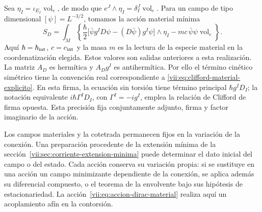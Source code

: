 Sea \(\eta_I=\iota_{E_I}\operatorname{vol}_e\), de modo que
\(e^J\wedge\eta_I=\delta_I^J\operatorname{vol}_e\). Para un
campo de tipo dimensional \([\psi]=L^{-3/2}\), tomamos la acción
material mínima
\begin{equation}
 S_D=\int_M\left\{
 \frac{\hbar}{2}
 \bigl[\bar\psi g^I D\psi-(D\bar\psi)g^I\psi\bigr]\wedge\eta_I
 -mc\,\bar\psi\psi\operatorname{vol}_e\right\}.
 \label{vii:eq:accion-dirac-material}
\end{equation}
Aquí \(\hbar=\hbar_{\rm int}\), \(c=c_{\rm int}\) y la masa
\(m\) es la lectura de la especie material en la coordenatización elegida.
Estos valores son salidas anteriores a esta realización. La matriz
\(A_D\) es hermítica y \(A_Dg^I\) es antihermítica. Por ello el
término cinético simétrico tiene la convención real correspondiente a
\eqref{vii:eq:clifford-material-explicito}. En esta firma, la ecuación
sin torsión tiene término principal \(\hbar g^I D_I\); la notación
equivalente \(i\hbar\Gamma^I D_I\), con \(\Gamma^I=-i g^I\),
emplea la relación de Clifford de firma opuesta. Esta precisión fija
conjuntamente adjunto, firma y factor imaginario de la acción.

Los campos materiales y la cotetrada permanecen fijos en la variación
de la conexión. Una preparación procedente de la extensión mínima de
la sección~\ref{vii:sec:corriente-extension-minima} puede determinar
el dato inicial del campo o del estado. Cada acción conserva su
variación propia: si se sustituye en una acción un campo minimizante
dependiente de la conexión, se aplica además su diferencial compuesto,
o el teorema de la envolvente bajo sus hipótesis de estacionariedad.
La acción~\eqref{vii:eq:accion-dirac-material} realiza aquí un
acoplamiento afín en la contorsión.

